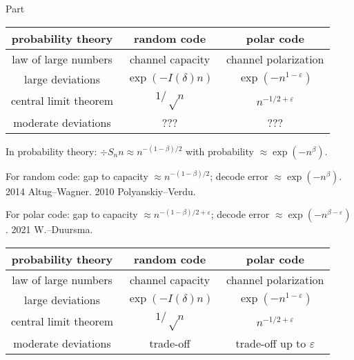 \documentclass[12pt, aspectratio=1610]{beamer}
\begin{document}
\begin{frame}
	\centering
	Part \insertromanpartnumber
	
	\color{structure.fg}
	\insertpart
\end{frame}

\begin{frame}
	\centering
	\def\arraystretch{1.5}
	\begin{tabular}{ccc}
		\toprule
		probability theory    & random code        & polar code           \\
		\midrule
		law of large numbers  & ~channel capacity~ & channel polarization \\
		large deviations      & $\exp(-I(δ)n)$     & $\exp(-n^{1-ε})$     \\
		central limit theorem & $1/√n$             & $n^{-1/2+ε}$         \\
		moderate deviations   & ???                & ???                  \\
		\bottomrule
	\end{tabular}
\end{frame}

\begin{frame}
	In probability theory: $÷{S_n}n ≈ n^{-(1-β)/2}$
	with probability $≈ \exp(-n^β)$.

	\pause

	For random code:
	gap to capacity $≈ n^{-(1-β)/2}$; decode error $≈ \exp(-n^β)$. \\
	2014 Altug--Wagner.
	2010 Polyanskiy--Verdu.

	\pause

	For polar code:
	gap to capacity $≈ n^{-(1-β)/2+ε}$; decode error $≈ \exp(-n^{β-ε})$.
	2021 W.--Duursma.
\end{frame}

\begin{frame}
	\centering
	\def\arraystretch{1.5}
	\begin{tabular}{ccc}
		\toprule
		probability theory    & random code        & polar code           \\
		\midrule
		law of large numbers  & ~channel capacity~ & channel polarization \\
		large deviations      & $\exp(-I(δ)n)$     & $\exp(-n^{1-ε})$     \\
		central limit theorem & $1/√n$             & $n^{-1/2+ε}$         \\
		moderate deviations   & trade-off          & trade-off up to $ε$  \\
		\bottomrule
	\end{tabular}
\end{frame}
\end{document}

